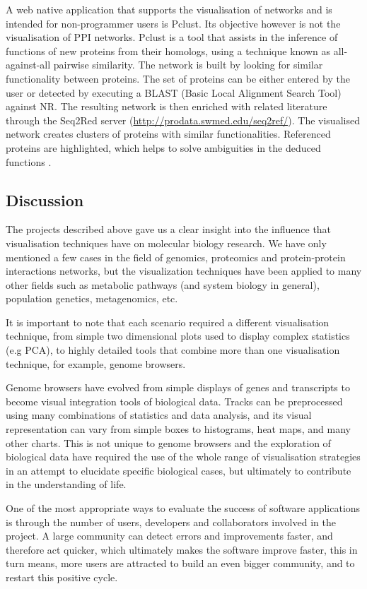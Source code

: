 A web native application that supports the visualisation of networks and is intended for non-programmer users is Pclust. Its objective however is not the visualisation of PPI networks. Pclust is a tool that assists in the inference of functions of new proteins from their homologs, using a technique known as all-against-all pairwise similarity. The network is built by looking for similar functionality between proteins. The set of proteins can be either entered by the user or detected by executing a BLAST (Basic Local Alignment Search Tool) against NR. The resulting network is then enriched with related literature through the Seq2Red server (\url{http://prodata.swmed.edu/seq2ref/}). The visualised network creates clusters of proteins with similar functionalities. Referenced proteins are highlighted, which helps to solve ambiguities in the deduced functions \cite{Li2013}.


\subsection{Discussion} \label{sec:intro-discusion}
The projects described above gave us a clear insight into the influence that visualisation techniques have on molecular biology research. We have only mentioned a few cases in the field of genomics, proteomics and protein-protein interactions networks, but the visualization techniques have been applied to many other fields such as metabolic pathways (and system biology in general), population genetics, metagenomics, etc.

It is important to note that each scenario required a different visualisation technique, from simple two dimensional plots used to display complex statistics (e.g PCA), to highly detailed tools that combine more than one visualisation technique, for example, genome browsers.

Genome browsers have evolved from simple displays of genes and transcripts to become visual integration tools of biological data. Tracks can be preprocessed using many combinations of statistics and data analysis, and its visual representation can vary from simple boxes to histograms, heat maps, and many other charts. This is not unique to genome browsers and the exploration of biological data have required the use of the whole range of visualisation strategies in an attempt to elucidate specific biological cases, but ultimately to contribute in the understanding of life.

One of the most appropriate ways to evaluate the success of software applications is through the number of users, developers and collaborators involved in the project. A large community can detect errors and improvements faster, and therefore act quicker, which ultimately makes the software improve faster, this in turn means, more users are attracted to build an even bigger community, and to restart this positive cycle.

